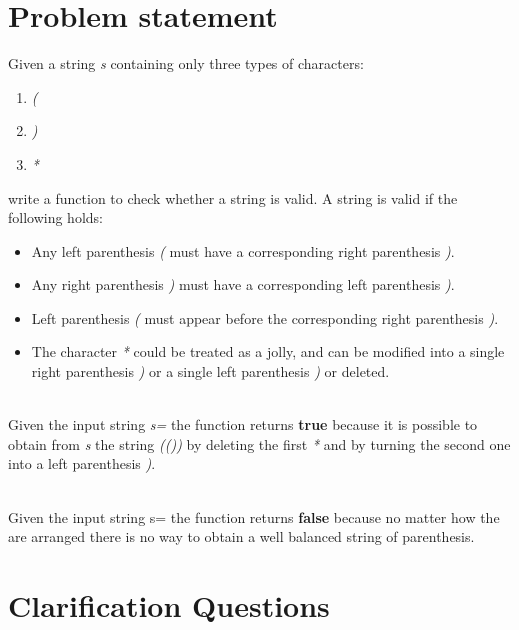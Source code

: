 \section{Problem statement}
\begin{exercise}
 Given a string \textit{s} containing only three types of characters:
 \begin{enumerate}
	 \item \textit{(}
	 \item \textit{)}
	 \item \textit{*}
 \end{enumerate}
 write a function to check whether a string is valid. A string is valid if the following  holds:

  \begin{itemize}
	\item  Any left parenthesis \textit{(} must have a corresponding  right parenthesis \textit{)}.
    \item Any right parenthesis \textit{)}  must have a corresponding left parenthesis \textit{)}.
    \item Left parenthesis \textit{(} must appear before the corresponding right parenthesis \textit{)}.
    \item The character \textit{*} could be treated as a jolly, and can be modified into a single right parenthesis  \textit{)} or a single left parenthesis \textit{)} or deleted.
 \end{itemize}  


	\begin{example}
		\hfill \\
		Given the input string \textit{s=\quotes{(**))}} the function returns \textbf{true} because it is possible to obtain from \textit{s} the string \textit{(())} by deleting the first \textit{*} and by turning the second one into a left parenthesis \textit{)}.
	\end{example}

	\begin{example}
		\hfill \\
		Given the input string s=\textit{\quotes{*(*)()(()}} the function returns \textbf{false} because no matter how the 	\inline{*} are arranged there is no way to obtain a well balanced string of parenthesis.
	\end{example}
\end{exercise}

\section{Clarification Questions}


